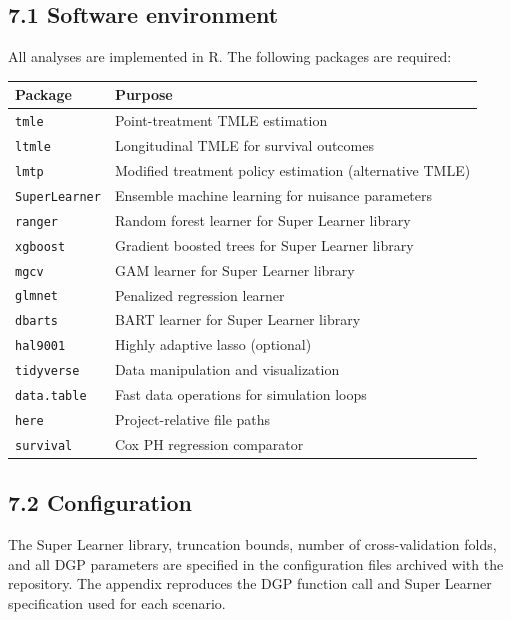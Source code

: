 \documentclass[
  letterpaper,
  DIV=11,
  numbers=noendperiod]{scrartcl}
\begin{document}
\subsection{7.1 Software environment}\label{software-environment}

All analyses are implemented in R. The following packages are required:

\begin{longtable}[]{@{}ll@{}}
\toprule\noalign{}
Package & Purpose \\
\midrule\noalign{}
\endhead
\bottomrule\noalign{}
\endlastfoot
\texttt{tmle} & Point-treatment TMLE estimation \\
\texttt{ltmle} & Longitudinal TMLE for survival outcomes \\
\texttt{lmtp} & Modified treatment policy estimation (alternative
TMLE) \\
\texttt{SuperLearner} & Ensemble machine learning for nuisance
parameters \\
\texttt{ranger} & Random forest learner for Super Learner library \\
\texttt{xgboost} & Gradient boosted trees for Super Learner library \\
\texttt{mgcv} & GAM learner for Super Learner library \\
\texttt{glmnet} & Penalized regression learner \\
\texttt{dbarts} & BART learner for Super Learner library \\
\texttt{hal9001} & Highly adaptive lasso (optional) \\
\texttt{tidyverse} & Data manipulation and visualization \\
\texttt{data.table} & Fast data operations for simulation loops \\
\texttt{here} & Project-relative file paths \\
\texttt{survival} & Cox PH regression comparator \\
\end{longtable}

\subsection{7.2 Configuration}\label{configuration}

The Super Learner library, truncation bounds, number of cross-validation
folds, and all DGP parameters are specified in the configuration files
archived with the repository. The appendix reproduces the DGP function
call and Super Learner specification used for each scenario.
\end{document}
